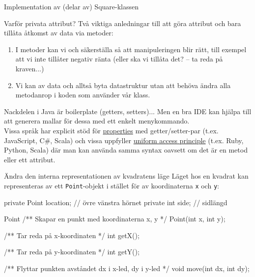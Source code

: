 \documentclass{lecturenotes}
\begin{document}
\begin{Slide}{Implementation av (delar av) Square-klassen}

\end{Slide}

\begin{Slide}{Varför privata attribut?}
Två viktiga anledningar till att göra attribut  och bara tillåta åtkomst av data via metoder:
\begin{enumerate}
\item I metoder kan vi  och säkerställa så att manipuleringen blir rätt, till exempel att vi inte tillåter negativ ränta (eller ska vi tillåta det? -- ta reda på kraven...)
\item Vi kan  av data och alltså byta datastruktur utan att behöva ändra alla metodanrop i koden som använder vår klass.
\end{enumerate}
\footnotesize Nackdelen i Java är boilerplate (getters, setters)... Men en bra IDE kan hjälpa till att generera mallar för dessa med ett enkelt menykommando.\\ \scriptsize Vissa språk har explicit stöd för \href{https://en.wikipedia.org/wiki/Property_\%28programming\%29}{properties} med getter/setter-par (t.ex. JavaScript, C\#, Scala)  och vissa uppfyller \href {https://en.wikipedia.org/wiki/Uniform_access_principle}{uniform access principle} (t.ex. Ruby, Python, Scala) där man kan använda samma syntax oavsett om det är en metod eller ett attribut.
\end{Slide}

\begin{Slide}{Ändra den interna representationen av kvadratens läge}
Läget hos en kvadrat kan representeras av ett \texttt{Point}-objekt i stället för av koordinaterna \texttt{x} och \texttt{y}:
\begin{Code}
private Point location; // övre vänstra hörnet
private int side;       // sidlängd
\end{Code}

\begin{ClassSpec}{Point}
/** Skapar en punkt med koordinaterna x, y */
Point(int x, int y); 

/** Tar reda på x-koordinaten */
int getX();

/** Tar reda på y-koordinaten */
int getY();

/** Flyttar punkten avståndet dx i x-led, 
    dy i y-led */
void move(int dx, int dy);
\end{ClassSpec}
\end{Slide}
\end{document}
